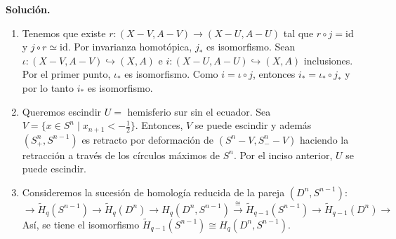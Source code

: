 \documentclass[11pt,a4paper]{article}
\theoremstyle{plain}
\theoremstyle{definition}
\theoremstyle{remark}
\begin{document}
\begin{enumerate}[label=\arabic*.,leftmargin=*]
\noindent\textbf{Solución.}
\begin{enumerate}[label=\alph*)]
\item Tenemos que existe $r:(X-V,A-V)\to(X-U,A-U)$ tal que $r\circ j=\mathrm{id}$
y $j\circ r\simeq\mathrm{id}$. Por invarianza homotópica, $j_*$ es
isomorfismo. Sean $\iota:(X-V,A-V)\hookrightarrow(X,A)$ e
$i:(X-U,A-U)\hookrightarrow(X,A)$ inclusiones. Por el primer punto,
$\iota_*$ es isomorfismo. Como $i=\iota\circ j$, entonces
$i_*=\iota_*\circ j_*$ y por lo tanto $i_*$ es isomorfismo.
\item Queremos escindir $U=$ hemisferio sur sin el ecuador. Sea
$V=\{x\in S^n\mid x_{n+1}<-\tfrac12\}$. Entonces, $V$ se puede escindir y
además $(S^n_+,S^{n-1})$ es retracto por deformación de
$(S^n-V,S^n_--V)$ haciendo la retracción a través de los círculos máximos
de $S^n$. Por el inciso anterior, $U$ se puede escindir.
\item Consideremos la sucesión de homología reducida de la pareja
$(D^n,S^{n-1})$:
\[
\to\tilde H_q(S^{n-1})\to\tilde H_q(D^n)\to H_q(D^n,S^{n-1})\xrightarrow{\cong}\tilde H_{q-1}(S^{n-1})\to\tilde H_{q-1}(D^n)\to
\]
Así, se tiene el isomorfismo
$\tilde H_{q-1}(S^{n-1})\cong H_q(D^n,S^{n-1})$.


\end{enumerate}
\end{enumerate}
\end{document}
